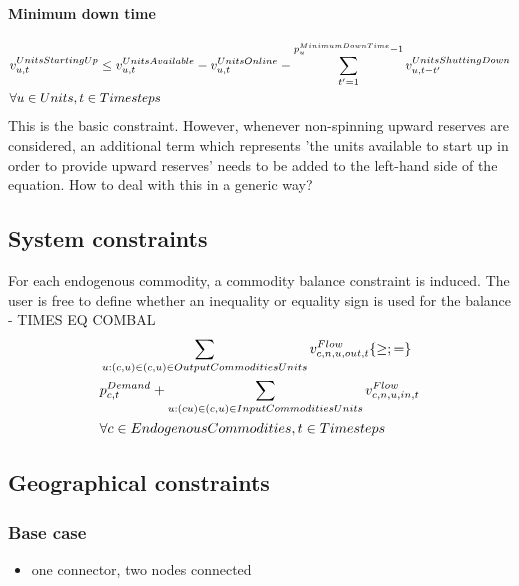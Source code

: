 \paragraph{Minimum down time}
\begin{align} \label{eq:minimumdowntime}
&\vUnitsStartingUp \le \vUnitsAvailable - \vUnitsOnline - \sum_{\timestep'=1}^{\pMinimumDownTime - 1} \vUnitsShuttingDown[\unit,\timestep-\timestep'] \nonumber \\
& \forall \units, \timesteps
\end{align}
{\color{red} This is the basic constraint. However, whenever non-spinning upward reserves are considered, an additional term which represents 'the units available to start up in order to provide upward reserves' needs to be added to the left-hand side of the equation. How to deal with this in a generic way?}






\subsection{System constraints}

For each endogenous commodity, a commodity balance constraint is induced. The user is free to define whether an inequality or equality sign is used for the balance - TIMES EQ COMBAL
\begin{align} \label{eq:commodity_balance}
&\sum_{\unit : (\commodity,\unit) \in \OutputCommoditiesUnits} \vFlow[\commodity,\node,\unit,out,\timestep] \{\ge;=\} \nonumber \\
&\pDemand + \sum_{\unit: (\commodity\unit) \in \InputCommoditiesUnits} \vFlow[\commodity,\node,\unit,in,\timestep] \nonumber \\
& \forall \EndogenousCommodities, \timesteps
\end{align}

\subsection{Geographical constraints}
\subsubsection{Base case}
\begin{itemize}
	\item one connector, two nodes connected
\end{itemize}
	\begin{figure}[h!]
		\centering
		
		\caption{}
		\label{}
	\end{figure}

